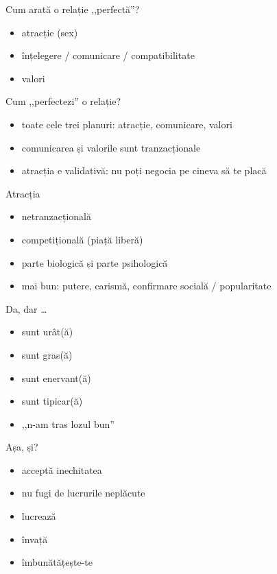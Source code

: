 \documentclass{simple}
\begin{document}
\begin{frame}{Cum arată o relație ,,perfectă''?}
  \begin{itemize}
    \pause
    \item atracție (sex)
    \pause
    \item înțelegere / comunicare / compatibilitate
    \pause
    \item valori
  \end{itemize}
\end{frame}

\begin{frame}{Cum ,,perfectezi'' o relație?}
  \begin{itemize}
    \pause
    \item toate cele trei planuri: atracție, comunicare, valori
    \pause
    \item comunicarea și valorile sunt tranzacționale
    \pause
    \item atracția e validativă: nu poți negocia pe cineva să te placă
  \end{itemize}
\end{frame}

\begin{frame}{Atracția}
  \begin{itemize}
    \pause
    \item netranzacțională
    \pause
    \item competițională (piață liberă)
    \pause
    \item parte biologică și parte psihologică
    \pause
    \item mai bun: putere, carismă, confirmare socială / popularitate
  \end{itemize}
\end{frame}

\begin{frame}{Da, dar \ldots}
  \begin{itemize}
    \pause
    \item sunt urât(ă)
    \pause
    \item sunt gras(ă)
    \pause
    \item sunt enervant(ă)
    \pause
    \item sunt tipicar(ă)
    \pause
    \item ,,n-am tras lozul bun''
  \end{itemize}
\end{frame}

\begin{frame}{Așa, și?}
  \begin{itemize}
    \pause
    \item acceptă inechitatea
    \pause
    \item nu fugi de lucrurile neplăcute
    \pause
    \item lucrează
    \pause
    \item învață
    \pause
    \item îmbunătățește-te
  \end{itemize}
\end{frame}
\end{document}
